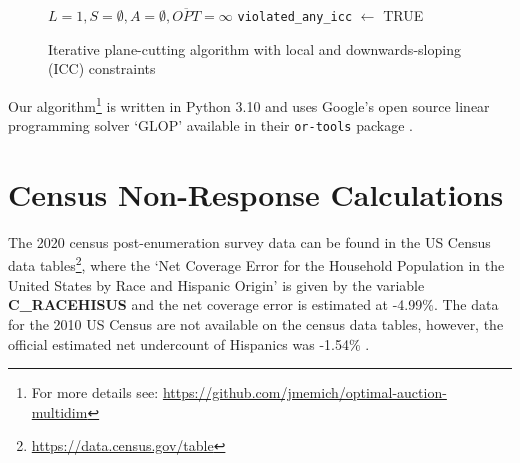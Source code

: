 \begin{figure}[t]
  \centering
  \begin{minipage}{.7\linewidth}
    \begin{algorithm}[H]
    \caption{Iterative plane-cutting algorithm with local and downwards-sloping (ICC) constraints}\label{alg:1}
    \SetAlgoLined
    $L = 1, S = \emptyset, A = \emptyset, \overline{OPT} = \infty$\;
    \texttt{violated\_any\_icc} $\gets $ TRUE\; 
    \end{algorithm}
  \end{minipage}
\end{figure}

Our algorithm\footnote{For more details see: \url{https://github.com/jmemich/optimal-auction-multidim}} is written in Python 3.10 and uses Google's open source linear programming solver `GLOP' available in their \texttt{or-tools} package \autocite{ortools}.

\section{Census Non-Response Calculations}\label{appendix_census_calc}

The 2020 census post-enumeration survey data can be found in the US Census data tables\footnote{\url{https://data.census.gov/table}}, where the `Net Coverage Error for the Household Population in the United States by Race and Hispanic Origin' is given by the variable \textbf{C\_RACEHISUS} and the net coverage error is estimated at -4.99\%. The data for the 2010 US Census are not available on the census data tables, however, the official estimated net undercount of Hispanics was -1.54\% \autocite[p1]{census2010coverage}.


